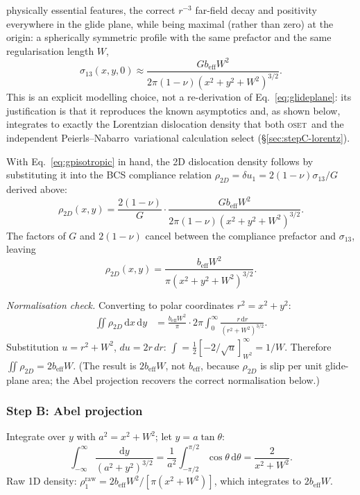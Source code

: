 \documentclass[5p,sort&compress]{elsarticle}
\newcommand{\OSET}{\textsc{oset}}
\newcommand{\beff}{b_\mathrm{eff}}
\newcommand{\PN}{Peierls--Nabarro}
\newcommand{\half}{\tfrac{1}{2}}
\begin{document}
physically essential features, the correct $r^{-3}$ far-field decay
and positivity everywhere in the glide plane, while being maximal
(rather than zero) at the origin: a spherically symmetric profile
with the same prefactor and the same regularisation length $W$,
\begin{equation}
  \sigma_{13}(x,y,0)\approx
  \frac{G\beff W^2}{2\pi(1-\nu)(x^2+y^2+W^2)^{3/2}}.
  \label{eq:gpisotropic}
\end{equation}
This is an explicit modelling choice, not a re-derivation of
Eq.~\eqref{eq:glideplane}: its justification is that it reproduces
the known asymptotics and, as shown below, integrates to exactly the
Lorentzian dislocation density that both \OSET\ and the independent
\PN\ variational calculation select (\S\ref{sec:stepC-lorentz}).

With Eq.~\eqref{eq:gpisotropic} in hand, the 2D dislocation density
follows by substituting it into the BCS compliance relation
$\rho_{2D}=\delta u_1=2(1-\nu)\sigma_{13}/G$ derived above:
\begin{equation}
  \rho_{2D}(x,y)=\frac{2(1-\nu)}{G}\cdot
  \frac{G\beff W^2}{2\pi(1-\nu)(x^2+y^2+W^2)^{3/2}}.
  \label{eq:rho2Dsub}
\end{equation}
The factors of $G$ and $2(1-\nu)$ cancel between the compliance
prefactor and $\sigma_{13}$, leaving
\begin{equation}
  \rho_{2D}(x,y)=\frac{\beff W^2}{\pi(x^2+y^2+W^2)^{3/2}}.
  \label{eq:rho2D}
\end{equation}

\textit{Normalisation check.}
Converting to polar coordinates $r^2=x^2+y^2$:
\begin{align*}
  \iint\rho_{2D}\,\mathrm dx\,\mathrm dy
  &=\frac{\beff W^2}{\pi}\cdot2\pi
    \int_0^\infty\frac{r\,\mathrm dr}{(r^2+W^2)^{3/2}}.
\end{align*}
Substitution $u=r^2+W^2$, $du=2r\,dr$:
$\int=\half[-2/\sqrt{u}]_{W^2}^\infty=1/W$.
Therefore $\iint\rho_{2D}=2\beff W$.
(The result is $2\beff W$, not $\beff$, because $\rho_{2D}$ is slip
per unit glide-plane area; the Abel projection recovers the correct
normalisation below.)

\subsubsection{Step B: Abel projection}
\label{sec:stepB-abel}

Integrate over $y$ with $a^2=x^2+W^2$; let $y=a\tan\theta$:
\begin{equation}
  \int_{-\infty}^\infty\frac{\mathrm dy}{(a^2+y^2)^{3/2}}
  =\frac{1}{a^2}\!\int_{-\pi/2}^{\pi/2}\cos\theta\,\mathrm d\theta
  =\frac{2}{x^2+W^2}.
  \label{eq:abel}
\end{equation}
Raw 1D density: $\rho_1^\text{raw}=2\beff W^2/[\pi(x^2+W^2)]$,
which integrates to $2\beff W$.
\end{document}
